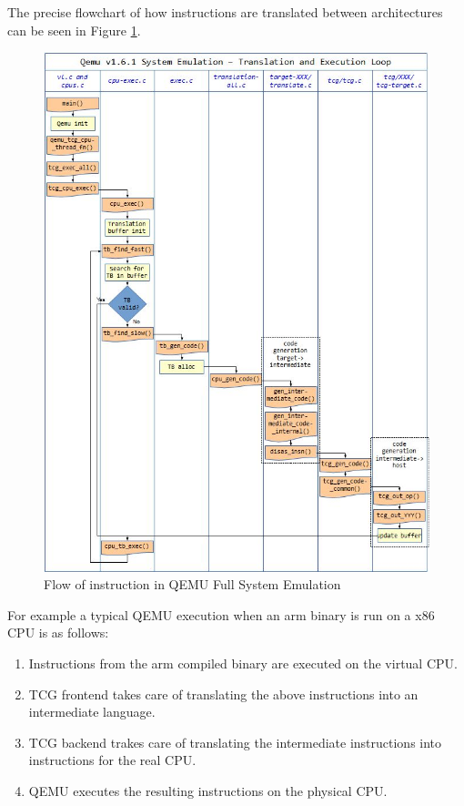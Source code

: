 The precise flowchart of how instructions are translated between architectures can be seen in Figure \ref{fig:qemuflow}.

\begin{figure}[htp]
\centering
\includegraphics[width=\linewidth]{images/qemutcg.jpg}
\caption{Flow of instruction in QEMU Full System Emulation}
\label{fig:qemuflow}
\end{figure}

For example a typical QEMU execution when an arm binary is run on a x86 CPU is as follows: 
\begin{enumerate}
    \item Instructions from the arm compiled binary are executed on the virtual CPU.
    \item TCG frontend takes care of translating the above instructions into an intermediate language. 
    \item TCG backend trakes care of translating the intermediate instructions into instructions for the real CPU. 
    \item QEMU executes the resulting instructions on the physical CPU. 
\end{enumerate}
